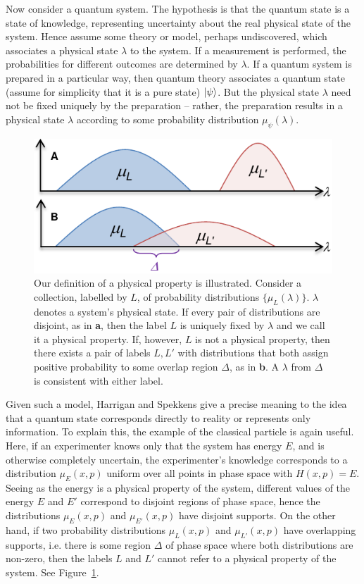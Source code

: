\documentclass[amsmath,amssymb,superscriptaddress,pra,12pt]{revtex4-1}
\begin{document}
Now consider a quantum system. The hypothesis is that the quantum state is a state of knowledge, representing uncertainty about the real physical state of the system. Hence assume some theory or model, perhaps undiscovered, which associates a physical state $\lambda$ to the system. If a measurement is performed, the probabilities for different outcomes are determined by $\lambda$. If a quantum system is prepared in a particular way, then quantum theory associates a quantum state (assume for simplicity that it is a pure state) $\ket{\psi}$. But the physical state $\lambda$ need not be fixed uniquely by the preparation -- rather, the preparation results in a physical state $\lambda$ according to some probability distribution $\mu_\psi(\lambda)$.

\begin{figure}
  \includegraphics[width=\columnwidth]{figs/nogofig1}
  \caption{Our definition of a physical property is illustrated. Consider a collection, labelled by $L$, of probability distributions $\{\mu_L(\lambda)\}$. $\lambda$ denotes a system's physical state. If every pair of distributions are disjoint, as in {\bf a}, then the label $L$ is uniquely fixed by $\lambda$ and we call it a physical property. If, however, $L$ is not a physical property, then there exists a pair of labels $L, L'$ with distributions that both assign positive probability to some overlap region $\Delta$, as in {\bf b}. A $\lambda$ from $\Delta$ is consistent with either label.}

  \label{fig1}
\end{figure}

Given such a model, Harrigan and Spekkens \cite{nic} give a precise meaning to the idea that a quantum state corresponds directly to reality or represents only information. To explain this, the example of the classical particle is again useful. Here, if an experimenter knows only that the system has energy $E$, and is otherwise completely uncertain, the experimenter's knowledge corresponds to a distribution $\mu_E(x,p)$ uniform over all points in phase space with $H(x,p)=E$. Seeing as the energy is a physical property of the system, different values of the energy $E$ and $E'$ correspond to disjoint regions of phase space, hence the distributions $\mu_E(x,p)$ and $\mu_{E'}(x,p)$ have disjoint supports. On the other hand, if two probability distributions $\mu_L(x,p)$ and $\mu_{L'}(x,p)$ have overlapping supports, i.e. there is some region $\Delta$ of phase space where both distributions are non-zero, then the labels $L$ and $L'$ cannot refer to a physical property of the system. See Figure~\ref{fig1}.
\end{document}
